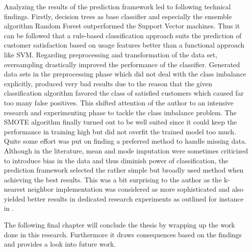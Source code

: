 Analyzing the results of the prediction framework led to following technical findings. Firstly, decision trees as base classifier and especially the ensemble algorithm Random Forest outperformed the Support Vector machines. Thus it can be followed that a rule-based classification approach suits the prediction of customer satisfaction based on usage features better than a functional approach like SVM. Regarding preprocessing and transformation of the data set, oversampling drastically improved the performance of the classifier. Generated data sets in the preprocessing phase which did not deal with the class imbalance explicitly, produced very bad results due to the reason that the given classification algorithm favored the class of satisfied customers which caused far too many false positives. This shifted attention of the author to an intensive research and experimenting phase to tackle the class imbalance problem. The SMOTE algorithm finally turned out to be well suited since it could keep the performance in training high but did not overfit the trained model too much. Quite some effort was put on finding a preferred method to handle missing data. Although in the literature, mean and mode imputation were sometimes criticized to introduce bias in the data and thus diminish power of classification, the prediction framework selected the rather simple but broadly used method when achieving the best results. This was a bit surprising to the author as the k-nearest neighbor implementation was considered as more sophisticated and also yielded better results in dedicated research experiments as outlined for instance in \cite{batista2003analysis}.

The following final chapter will conclude the thesis by wrapping up the work done in this research. Furthermore it draws consequences based on the findings and provides a look into future work. 